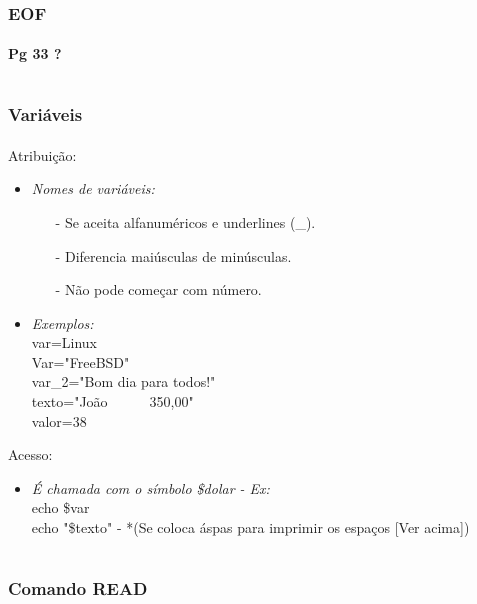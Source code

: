 \documentclass[aspectratio=1610]{beamer}
\begin{document}
\begin{frame}
  \frametitle{EOF}
  \framesubtitle{Pg 33 ?}

\end{frame}


\section [Variáveis]{}
\begin{frame}
  \frametitle{Variáveis}
  \framesubtitle{}
  
  \begin{block}{Atribuição:}
	\begin{itemize}
	\item {\textit{Nomes de variáveis:}} 
		\begin{itemize}	
		\item[-]{Se aceita alfanuméricos e underlines (\_). }
		\item[-]{Diferencia maiúsculas de minúsculas. }
		\item[-]{Não pode começar com número.}
		\end{itemize}
	\item {\textit{Exemplos:}} \\
  		var=Linux \\
  		Var="FreeBSD" \\
  		var\_2="Bom dia para todos!" \\
  		texto="João\ \ \ \ \ \ 350,00"\\
  		valor=38 \\
	\end{itemize}
  \end{block}
  
  
  \begin{block}{Acesso:}
	  \begin{itemize}
	  	\item{\textit{É chamada com o símbolo \$dolar - Ex:}}\\
	  	echo \$var \\
	  	echo "\$texto" - *\scriptsize {(Se coloca áspas para imprimir os espaços [Ver acima])}
	  \end{itemize}
  \end{block}

\end{frame}


\section [READ]{}
\begin{frame}
  \frametitle{Comando READ}
  \framesubtitle{}

\end{frame}
\end{document}
